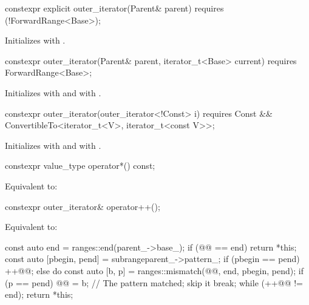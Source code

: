 %
\begin{itemdecl}
constexpr explicit outer_iterator(Parent& parent)
  requires (!ForwardRange<Base>);
\end{itemdecl}

\begin{itemdescr}
\pnum
\effects Initializes  with .
\end{itemdescr}

%
\begin{itemdecl}
constexpr outer_iterator(Parent& parent, iterator_t<Base> current)
  requires ForwardRange<Base>;
\end{itemdecl}

\begin{itemdescr}
\pnum
\effects Initializes  with 
and  with .
\end{itemdescr}

%
\begin{itemdecl}
constexpr outer_iterator(outer_iterator<!Const> i)
  requires Const && ConvertibleTo<iterator_t<V>, iterator_t<const V>>;
\end{itemdecl}

\begin{itemdescr}
\pnum
\effects Initializes  with  and
 with .
\end{itemdescr}

%
\begin{itemdecl}
constexpr value_type operator*() const;
\end{itemdecl}

\begin{itemdescr}
\pnum
\effects Equivalent to: 
\end{itemdescr}

%
\begin{itemdecl}
constexpr outer_iterator& operator++();
\end{itemdecl}

\begin{itemdescr}
\pnum
\effects Equivalent to:
\begin{codeblock}
const auto end = ranges::end(parent_->base_);
if (@@ == end) return *this;
const auto [pbegin, pend] = subrange{parent_->pattern_};
if (pbegin == pend) ++@@;
else {
  do {
    const auto [b, p] = ranges::mismatch(@@, end, pbegin, pend);
    if (p == pend) {
      @@ = b;  // The pattern matched; skip it
      break;
    }
  } while (++@@ != end);
}
return *this;
\end{codeblock}
\end{itemdescr}

